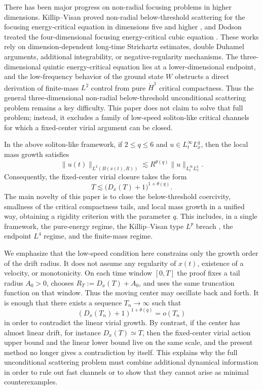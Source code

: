 \documentclass[smallextended,envcountsect,nospthms]{svjour3}
\numberwithin{equation}{section}
\theoremstyle{spbreak}
\theoremstyle{spdefbreak}
\theoremstyle{spdefbreak}
\begin{document}
There has been major progress on non-radial focusing problems in higher dimensions. Killip--Visan proved non-radial below-threshold scattering for the focusing energy-critical equation in dimensions five and higher \cite{KillipVisan2010}, and Dodson treated the four-dimensional focusing energy-critical cubic equation \cite{Dodson2019}. These works rely on dimension-dependent long-time Strichartz estimates, double Duhamel arguments, additional integrability, or negative-regularity mechanisms. The three-dimensional quintic energy-critical equation lies at a lower-dimensional endpoint, and the low-frequency behavior of the ground state $W$ obstructs a direct derivation of finite-mass $L^2$ control from pure $\dot H^1$ critical compactness. Thus the general three-dimensional non-radial below-threshold unconditional scattering problem remains a key difficulty. This paper does not claim to solve that full problem; instead, it excludes a family of low-speed soliton-like critical channels for which a fixed-center virial argument can be closed.

In the above soliton-like framework, if $2\le q\le6$ and $u\in L_t^\infty L_x^q$, then the local mass growth satisfies
\[
  \|u(t)\|_{L^2(B(x(t),R))}
  \lesssim R^{\theta(q)}\|u\|_{L_t^\infty L_x^q}.
\]
Consequently, the fixed-center virial closure takes the form
\[
  T\lesssim \bigl(D_x(T)+1\bigr)^{1+\theta(q)}.
\]
The main novelty of this paper is to close the below-threshold coercivity, smallness of the critical compactness tails, and local mass growth in a unified way, obtaining a rigidity criterion with the parameter $q$. This includes, in a single framework, the pure-energy regime, the Killip--Visan type $L^p$ breach \cite{KillipVisan2013}, the endpoint $L^4$ regime, and the finite-mass regime.

We emphasize that the low-speed condition here constrains only the growth order of the drift radius. It does not assume any regularity of $x(t)$, existence of a velocity, or monotonicity. On each time window $[0,T]$ the proof fixes a tail radius $A_0>0$, chooses $R_T:=D_x(T)+A_0$, and uses the same truncation function on that window. Thus the moving center may oscillate back and forth. It is enough that there exists a sequence $T_n\to\infty$ such that
\[
  (D_x(T_n)+1)^{1+\theta(q)}=o(T_n)
\]
in order to contradict the linear virial growth. By contrast, if the center has almost linear drift, for instance $D_x(T)\simeq T$, then the fixed-center virial action upper bound and the linear lower bound live on the same scale, and the present method no longer gives a contradiction by itself. This explains why the full unconditional scattering problem must combine additional dynamical information in order to rule out fast channels or to show that they cannot arise as minimal counterexamples.
\end{document}
